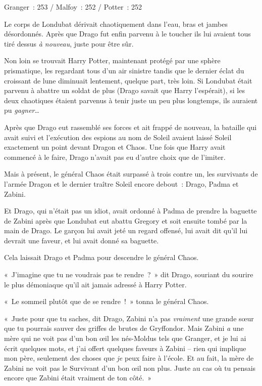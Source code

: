 \later

Granger~: 253 / Malfoy~: 252 / Potter~: 252

Le corps de Londubat dérivait chaotiquement dans l'eau, bras et jambes désordonnés. Après que Drago fut enfin parvenu à le toucher ils lui avaient tous tiré dessus \emph{à nouveau}, juste pour être sûr.

Non loin se trouvait Harry Potter, maintenant protégé par une sphère prismatique, les regardant tous d'un air sinistre tandis que le dernier éclat du croissant de lune diminuait lentement, quelque part, très loin. Si Londubat était parvenu à abattre un soldat de plus (Drago savait que Harry l'espérait), si les deux chaotiques étaient parvenus à tenir juste un peu plus longtemps, ils auraient pu \emph{gagner}…

Après que Drago eut rassemblé ses forces et ait frappé de nouveau, la bataille qui avait suivi et l'exécution des espions au nom de Soleil avaient laissé Soleil exactement un point devant Dragon et Chaos. Une fois que Harry avait commencé à le faire, Drago n'avait pas eu d'autre choix que de l'imiter.

Mais à présent, le général Chaos était surpassé à trois contre un, les survivants de l'armée Dragon et le dernier traître Soleil encore debout~: Drago, Padma et Zabini.

Et Drago, qui n'était pas un idiot, avait ordonné à Padma de prendre la baguette de Zabini après que Londubat eut abattu Gregory et soit ensuite tombé par la main de Drago. Le garçon lui avait jeté un regard offensé, lui avait dit qu'il lui devrait une faveur, et lui avait donné sa baguette.

Cela laissait Drago et Padma pour descendre le général Chaos.

«~J'imagine que tu ne voudrais pas te rendre~?~» dit Drago, souriant du sourire le plus démoniaque qu'il ait jamais adressé à Harry Potter.

«~Le sommeil plutôt que de se rendre~!~» tonna le général Chaos.

«~Juste pour que tu saches, dit Drago, Zabini n'a pas \emph{vraiment} une grande sœur que tu pourrais sauver des griffes de brutes de Gryffondor. Mais Zabini \emph{a} une mère qui ne voit pas d'un bon œil les nés-Moldus tels que Granger, et je lui ai écrit quelques mots, et j'ai offert quelques faveurs à Zabini -- rien qui implique mon père, seulement des choses que \emph{je} peux faire à l'école. Et au fait, la mère de Zabini ne voit pas le Survivant d'un bon œil non plus. Juste au cas où tu pensais encore que Zabini était vraiment de ton côté.~»

